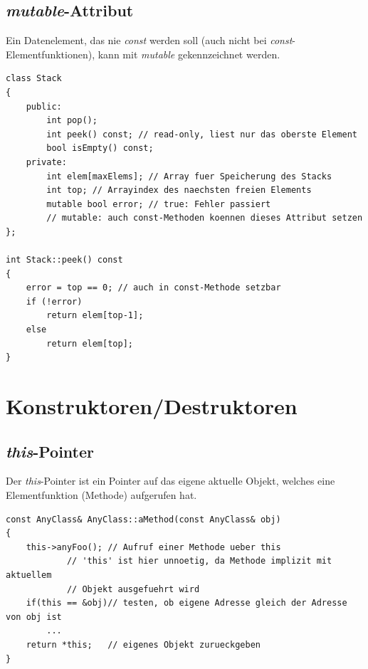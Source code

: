 \subsection{\emph{mutable}-Attribut}
Ein Datenelement, das nie \emph{const} werden soll (auch nicht bei \emph{const}-Elementfunktionen), kann mit \emph{mutable} gekennzeichnet werden.
\vspace{-\baselineskip}
\begin{minipage}{0.85\linewidth}
\begin{lstlisting}
class Stack
{
	public:
		int pop();
		int peek() const; // read-only, liest nur das oberste Element
		bool isEmpty() const;
	private:
		int elem[maxElems]; // Array fuer Speicherung des Stacks
		int top; // Arrayindex des naechsten freien Elements
		mutable bool error; // true: Fehler passiert
		// mutable: auch const-Methoden koennen dieses Attribut setzen
};

int Stack::peek() const
{
	error = top == 0; // auch in const-Methode setzbar
	if (!error)
		return elem[top-1];
	else
		return elem[top];
}
\end{lstlisting}
\end{minipage}

\clearpage
\section{Konstruktoren/Destruktoren}

\subsection{\emph{this}-Pointer}
Der \emph{this}-Pointer ist ein Pointer auf das eigene aktuelle Objekt, welches eine Elementfunktion (Methode) aufgerufen hat.
\begin{minipage}{\linewidth}
\vspace{-\baselineskip}
\begin{lstlisting}
const AnyClass& AnyClass::aMethod(const AnyClass& obj)
{
	this->anyFoo();	// Aufruf einer Methode ueber this
			// 'this' ist hier unnoetig, da Methode implizit mit aktuellem
			// Objekt ausgefuehrt wird
	if(this == &obj)// testen, ob eigene Adresse gleich der Adresse von obj ist
		...
	return *this;	// eigenes Objekt zurueckgeben
}
\end{lstlisting}
\end{minipage}

